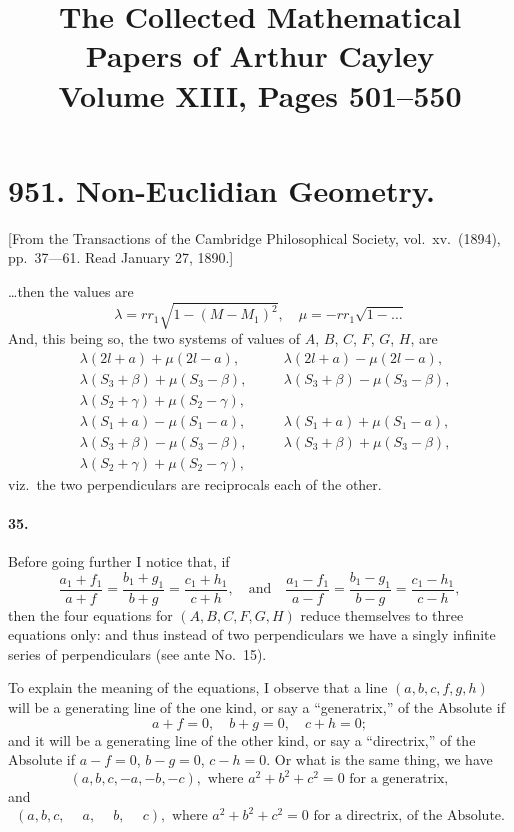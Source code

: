\documentclass[11pt,a4paper]{article}
\title{\textbf{The Collected Mathematical Papers of Arthur Cayley}\\[6pt]
\large Volume XIII, Pages 501--550}
\author{}
\date{}
\theoremstyle{plain}
\begin{document}
\maketitle
\thispagestyle{empty}

\tableofcontents
\newpage

\section*{951. Non-Euclidian Geometry.}

[From the Transactions of the Cambridge Philosophical Society, vol.~xv.~(1894), pp.~37---61. Read January 27, 1890.]

\bigskip

\noindent
\ldots then the values are
\[
\lambda = rr_1 \sqrt{1 - (M - M_1)^2}, \quad
\mu = -rr_1 \sqrt{1 - \ldots}
\]
And, this being so, the two systems of values of $A$, $B$, $C$, $F$, $G$, $H$, are
\begin{align*}
&\lambda(2l + a) + \mu(2l - a), \quad &&\lambda(2l + a) - \mu(2l - a), \\
&\lambda (S_3 + \beta) + \mu (S_3 - \beta), \quad &&\lambda (S_3 + \beta) - \mu (S_3 - \beta), \\
&\lambda (S_2 + \gamma) + \mu (S_2 - \gamma), \\
&\lambda(S_1+ a) - \mu(S_1- a), \quad &&\lambda(S_1 + a) + \mu(S_1 - a), \\
&\lambda (S_3 + \beta) - \mu (S_3 - \beta), \quad &&\lambda (S_3 + \beta) + \mu (S_3 - \beta), \\
&\lambda (S_2 + \gamma) + \mu (S_2 - \gamma),
\end{align*}
viz.~the two perpendiculars are reciprocals each of the other.

\paragraph{35.} Before going further I notice that, if
\[
\frac{a_1 + f_1}{a + f} = \frac{b_1 + g_1}{b + g} = \frac{c_1 + h_1}{c + h},
\quad\text{and}\quad
\frac{a_1 - f_1}{a - f} = \frac{b_1 - g_1}{b - g} = \frac{c_1 - h_1}{c - h},
\]
then the four equations for $(A, B, C, F, G, H)$ reduce themselves to three equations
only: and thus instead of two perpendiculars we have a singly infinite series of
perpendiculars (see ante No.~15).

To explain the meaning of the equations, I observe that a line $(a, b, c, f, g, h)$
will be a generating line of the one kind, or say a ``generatrix,'' of the Absolute if
\[
a+f=0, \quad b+g = 0, \quad c + h = 0;
\]
and it will be a generating line of the other kind, or say a ``directrix,'' of the
Absolute if $a-f=0$, $b-g = 0$, $c - h = 0$. Or what is the same thing, we have
\[
(a, b, c, -a, -b, -c), \text{ where } a^2 + b^2 + c^2 = 0 \text{ for a generatrix},
\]
and
\[
(a, b, c, \phantom{-}a, \phantom{-}b, \phantom{-}c), \text{ where } a^2 + b^2 + c^2 = 0 \text{ for a directrix, of the Absolute}.
\]
\end{document}
